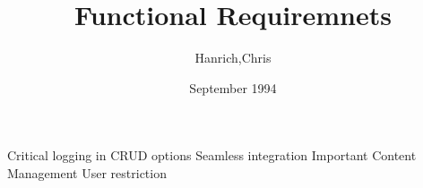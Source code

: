 \documentclass{article}
\title{Functional Requiremnets}
\author{Hanrich,Chris}
\date{September 1994}
\begin{document}
\maketitle
Critical
	logging in
	CRUD options
	Seamless integration
Important
	Content Management
	User restriction
\end{document}
